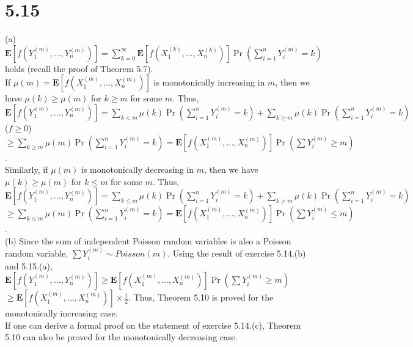 \documentclass{article}
\begin{document}
\section*{5.15}
(a) $\textbf{E}[f(Y_1^{(m)},...,Y_n^{(m)})]=\sum\limits_{k=0}^\infty\textbf{E}[f(X_1^{(k)},...,X_n^{(k)})]\Pr(\sum\limits_{i=1}^nY_i^{(m)}=k)$
holds (recall the proof of Theorem 5.7).\\
If $\mu(m)=\textbf{E}[f(X_1^{(m)},...,X_n^{(m)})]$ is monotonically increasing in $m$, then we have $\mu(k)\geq\mu(m)$ for $k\geq m$ for some $m$.
Thus, $\textbf{E}[f(Y_1^{(m)},...,Y_n^{(m)})]=\sum\limits_{k<m}\mu(k)\Pr(\sum\limits_{i=1}^n Y_i^{(m)}=k)+\sum\limits_{k\geq m}\mu(k)\Pr(\sum\limits_{i=1}^n Y_i^{(m)}=k)$ ($f\geq 0$)\\
$\geq \sum\limits_{k\geq m}\mu(m)\Pr(\sum\limits_{i=1}^n Y_i^{(m)}=k)=\textbf{E}[f(X_1^{(m)},...,X_n^{(m)})]\Pr(\sum Y_i^{(m)}\geq m)$.\\
Similarly, if $\mu(m)$ is monotonically decreasing in $m$, then we have $\mu(k)\geq\mu(m)$ for $k\leq m$ for some $m$. Thus,\\
$\textbf{E}[f(Y_1^{(m)},...,Y_n^{(m)})]=\sum\limits_{k\leq m}\mu(k)\Pr(\sum\limits_{i=1}^n Y_i^{(m)}=k)+\sum\limits_{k> m}\mu(k)\Pr(\sum\limits_{i=1}^n Y_i^{(m)}=k)$\\
$\geq \sum\limits_{k\leq m}\mu(m)\Pr(\sum\limits_{i=1}^n Y_i^{(m)}=k)=\textbf{E}[f(X_1^{(m)},...,X_n^{(m)})]\Pr(\sum Y_i^{(m)}\leq m)$.\\
(b) Since the sum of independent Poisson random variables is also a Poisson random variable, $\sum Y_i^{(m)}\sim Poisson(m)$.
Using the result of exercise 5.14.(b) and 5.15.(a), $\textbf{E}[f(Y_1^{(m)},...,Y_n^{(m)})]\geq \textbf{E}[f(X_1^{(m)},...,X_n^{(m)})]\Pr(\sum Y_i^{(m)}\geq m)$\\
$\geq \textbf{E}[f(X_1^{(m)},...,X_n^{(m)})]\times \frac{1}{2}$.
Thus, Theorem 5.10 is proved for the monotonically increasing case.\\
If one can derive a formal proof on the statement of exercise 5.14.(c), Theorem 5.10 can also be proved for the monotonically decreasing case.
\end{document}
